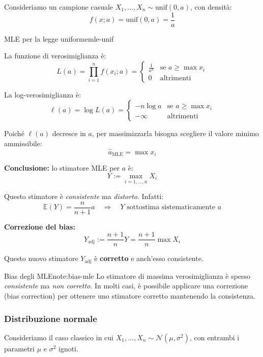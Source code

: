 Consideriamo un campione casuale \( X_1, \dots, X_n \sim \mathrm{unif}(0,a) \), con densità:
\[
    f(x;a) = \mathrm{unif}(0,a) = \frac{1}{a}
\]
\begin{esempio}{MLE per la legge uniforme}{mle-unif}

La funzione di verosimiglianza è:
\[
L(a) = \prod_{i=1}^n f(x_i; a) = 
\begin{cases}
\frac{1}{a^n} & \text{se } a \geq \max x_i \\
0 & \text{altrimenti}
\end{cases}
\]

La log-verosimiglianza è:
\[
\ell(a) = \log L(a) = 
\begin{cases}
- n \log a & \text{se } a \geq \max x_i \\
-\infty & \text{altrimenti}
\end{cases}
\]

Poiché \( \ell(a) \) decresce in \( a \), per massimizzarla bisogna scegliere il valore minimo ammissibile:
\[
\hat{a}_{\text{MLE}} = \max x_i
\]

\medskip
\textbf{Conclusione:} lo stimatore MLE per \( a \) è:
\[
Y := \max_{i=1,\dots,n} X_i
\]

\medskip

Questo stimatore è \emph{consistente} ma \emph{distorto}. Infatti:
\[
\mathbb{E}(Y) = \frac{n}{n+1} a
\quad \Rightarrow \quad
Y \text{ sottostima sistematicamente } a
\]

\medskip
\textbf{Correzione del bias:}
\[
Y_{\text{adj}} := \frac{n+1}{n} Y = \frac{n+1}{n} \max X_i
\]

Questo nuovo stimatore \( Y_{\text{adj}} \) è \textbf{corretto} e anch'esso consistente.

\begin{nota}{Bias degli MLE}{note:bias-mle}
Lo stimatore di massima verosimiglianza è spesso \emph{consistente} ma \emph{non corretto}. In molti casi, è possibile applicare una correzione (bias correction) per ottenere uno stimatore corretto mantenendo la consistenza.
\end{nota}
\end{esempio}


\subsubsection{Distribuzione normale}

Consideriamo il caso classico in cui \( X_1, \dots, X_n \sim \mathcal{N}(\mu, \sigma^2) \), con entrambi i parametri \( \mu \) e \( \sigma^2 \) ignoti.

